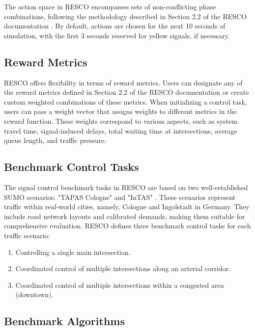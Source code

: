 The action space in RESCO encompasses sets of non-conflicting phase combinations, following the methodology described in Section 2.2 of the RESCO documentation \cite{codeca2018monaco}. By default, actions are chosen for the next 10 seconds of simulation, with the first 3 seconds reserved for yellow signals, if necessary.

\subsection{Reward Metrics}

RESCO offers flexibility in terms of reward metrics. Users can designate any of the reward metrics defined in Section 2.2 of the RESCO documentation\cite{codeca2018monaco} or create custom weighted combinations of these metrics. When initializing a control task, users can pass a weight vector that assigns weights to different metrics in the reward function. These weights correspond to various aspects, such as system travel time, signal-induced delays, total waiting time at intersections, average queue length, and traffic pressure.

\subsection{Benchmark Control Tasks}

The signal control benchmark tasks in RESCO are based on two well-established SUMO scenarios: "TAPAS Cologne" and "InTAS" \cite{pham2013learning, lobo2020intas}. These scenarios represent traffic within real-world cities, namely, Cologne and Ingolstadt in Germany. They include road network layouts and calibrated demands, making them suitable for comprehensive evaluation. RESCO defines three benchmark control tasks for each traffic scenario:

\begin{enumerate}
    \item Controlling a single main intersection.
    \item Coordinated control of multiple intersections along an arterial corridor.
    \item Coordinated control of multiple intersections within a congested area (downtown).
\end{enumerate}

\subsection{Benchmark Algorithms}

